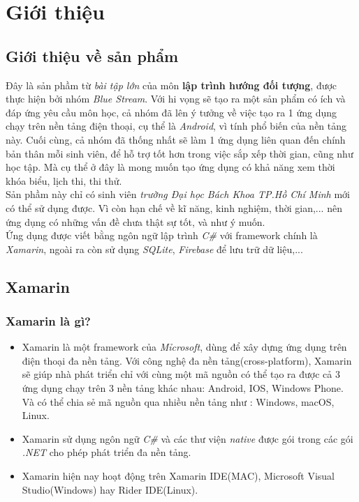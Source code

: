 \documentclass[a4paper]{article}
\begin{document}
\newpage
\tableofcontents
\newpage
\section{Giới thiệu}
\subsection{Giới thiệu về sản phẩm}
\hspace*{1 cm}Đây là sản phầm từ \textit{bài tập lớn} của môn \textbf{lập trình hướng đối tượng}, được thực hiện bởi nhóm \textit{Blue Stream}. Với hi vọng sẽ tạo ra một sản phẩm có ích và đáp ứng yêu cầu môn học, cả nhóm đã lên ý tưởng về việc tạo ra 1 ứng dụng chạy trên nền tảng điện thoại, cụ thể là \textit{Android}, vì tính phổ biến của nền tảng này. Cuối cùng, cả nhóm đã thống nhất sẽ làm 1 ứng dụng liên quan đến chính bản thân mỗi sinh viên, để hỗ trợ tốt hơn trong việc sắp xếp thời gian, cũng như học tập. Mà cụ thể ở đây là mong muốn tạo ứng dụng có khả năng xem thời khóa biểu, lịch thi, thi thử.\\
\hspace*{1 cm} Sản phầm này chỉ có sinh viên \textit{trường Đại học Bách Khoa TP.Hồ Chí Minh} mới có thể sử dụng được. Vì còn hạn chế về kĩ năng, kinh nghiệm, thời gian,... nên ứng dụng có những vấn đề chưa thật sự tốt, và như ý muốn.\\
\hspace*{1 cm}Ứng dụng được viết bằng ngôn ngữ lập trình \textit{C\#} với framework chính là \textit{Xamarin}, ngoài ra còn sử dụng \textit{SQLite}, \textit{Firebase} để lưu trữ dữ liệu,...
\subsection{Xamarin}
\subsubsection{Xamarin là gì?}
\begin{itemize}
    \item  Xamarin là một framework của \textit{Mỉcrosoft}, dùng để xây dựng ứng dụng trên điện thoại đa nền tảng. Với công nghệ đa nền tảng(cross-platform), Xamarin sẽ giúp nhà phát triển chỉ với cùng một mã nguồn có thể tạo ra được cả 3 ứng dụng chạy trên 3 nền tảng khác nhau: Android, IOS, Windows Phone. Và có thể chia sẻ mã nguồn qua nhiều nền tảng như : Windows, macOS, Linux.
\item Xamarin sử dụng ngôn ngữ \textit{C\#} và các thư viện \textit{native} được gói trong các gói \textit{.NET} cho phép phát triển đa nền tảng. 
\item Xamarin hiện nay hoạt động trên Xamarin IDE(MAC),  Microsoft Visual Studio(Windows) hay Rider IDE(Linux).
\end{itemize}
\end{document}
